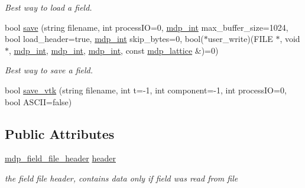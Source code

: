 \begin{DoxyCompactItemize}
\begin{DoxyCompactList}\small\item\em Best way to load a field. \end{DoxyCompactList}\item 
bool \hyperlink{classmdp__field_a66bbe9d66cc3ad2a5955282df3519471}{save} (string filename, int process\+IO=0, \hyperlink{mdp__global__vars_8h_aaa1ad9d0dcd2124aa5af0120d9954174}{mdp\+\_\+int} max\+\_\+buffer\+\_\+size=1024, bool load\+\_\+header=true, \hyperlink{mdp__global__vars_8h_aaa1ad9d0dcd2124aa5af0120d9954174}{mdp\+\_\+int} skip\+\_\+bytes=0, bool($\ast$user\+\_\+write)(F\+I\+LE $\ast$, void $\ast$, \hyperlink{mdp__global__vars_8h_aaa1ad9d0dcd2124aa5af0120d9954174}{mdp\+\_\+int}, \hyperlink{mdp__global__vars_8h_aaa1ad9d0dcd2124aa5af0120d9954174}{mdp\+\_\+int}, \hyperlink{mdp__global__vars_8h_aaa1ad9d0dcd2124aa5af0120d9954174}{mdp\+\_\+int}, const \hyperlink{classmdp__lattice}{mdp\+\_\+lattice} \&)=0)
\begin{DoxyCompactList}\small\item\em Best way to save a field. \end{DoxyCompactList}\item 
bool \hyperlink{classmdp__field_a8ad4d41e9c53df910f114031f84e0845}{save\+\_\+vtk} (string filename, int t=-\/1, int component=-\/1, int process\+IO=0, bool A\+S\+C\+II=false)
\end{DoxyCompactItemize}
\subsection*{Public Attributes}
\begin{DoxyCompactItemize}
\item 
\hyperlink{classmdp__field__file__header}{mdp\+\_\+field\+\_\+file\+\_\+header} \hyperlink{classmdp__field_a465dfc6a95fe7ca5016595550cd024d9}{header}
\begin{DoxyCompactList}\small\item\em the field file header, contains data only if field was read from file \end{DoxyCompactList}\end{DoxyCompactItemize}
